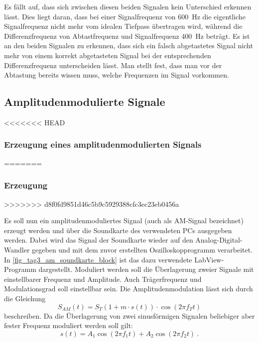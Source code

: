 \documentclass[
a4paper,
12pt,
pagesize,
ngerman
]{scrartcl}
\begin{document}
	Es fällt auf, dass sich zwischen diesen beiden Signalen kein Unterschied erkennen lässt.
	Dies liegt daran, dass bei einer Signalfrequenz von \SI{600}{\hertz} die eigentliche Signalfrequenz nicht mehr vom idealen Tiefpass übertragen wird, während die Differenzfrequenz von Abtastfrequenz und Signalfrequenz \SI{400}{\hertz} beträgt.
	Es ist an den beiden Signalen zu erkennen, dass sich ein falsch abgetastetes Signal nicht mehr von einem korrekt abgetasteten Signal bei der entsprechenden Differenzfrequenz unterscheiden lässt.
	Man stellt fest, dass man vor der Abtastung bereits wissen muss, welche Frequenzen im Signal vorkommen. 
	
	
	\subsection{Amplitudenmodulierte Signale} %
	
<<<<<<< HEAD
	\subsubsection{Erzeugung eines amplitudenmodulierten Signals} %
=======
	\subsubsection{Erzeugung} \label{AMSignalErzeugung} %
>>>>>>> d8f0fd9851d46c5b9c5929388cfc3ec23eb0456a
	
	Es soll nun ein amplitudenmoduliertes Signal (auch als AM-Signal bezeichnet) erzeugt werden und über die Soundkarte des verwendeten PCs ausgegeben werden.
	Dabei wird das Signal der Soundkarte wieder auf den Analog-Digital-Wandler gegeben und mit dem zuvor erstellten Oszilloskopprogramm verarbeitet.
	In \cref{fig_tag3_am_soundkarte_block} ist das dazu verwendete LabView-Programm dargestellt.
	Moduliert werden soll die Überlagerung zweier Signale mit einstellbarer Frequenz und Amplitude.
	Auch Trägerfrequenz und Modulationsgrad soll einstellbar sein.
	Die Amplitudenmodulation lässt sich durch die Gleichung
	\begin{equation} \label{AMFormel}
		S_{AM}(t)=S_T (1+m \cdot s(t)) \cdot \cos(2\pi f_T t)
	\end{equation}
	beschreiben.
	Da die Überlagerung von zwei sinusförmigen Signalen beliebiger aber fester Frequenz moduliert werden soll gilt:
	\begin{equation} \label{Ursprungssignal}
		s(t) = A_1 \cos (2\pi f_1 t) + A_2 \cos (2\pi f_2 t) \ . 
	\end{equation}
	
\end{document}
